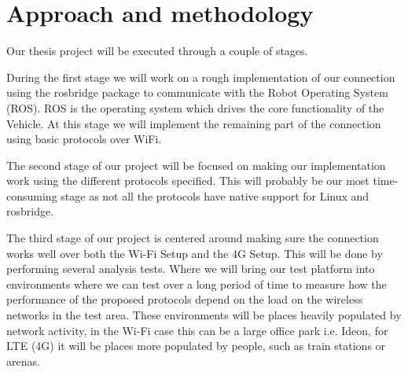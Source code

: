 \documentclass[a4paper]{article}
\begin{document}





\section{Approach and methodology}


Our thesis project will be executed through a couple of stages.

During the first stage we will work on a rough implementation of our connection
using the rosbridge package to communicate with the Robot Operating System
(ROS). ROS is the operating system which drives the core functionality of the 
Vehicle. At this stage we will implement the remaining part of the connection
using basic protocols over WiFi.

The second stage of our project will be focused on making our implementation 
work using the different protocols specified. This will probably be our most 
time-consuming stage as not all the protocols have native support for Linux and
rosbridge.

The third stage of our project is centered around making sure the connection 
works well over both the Wi-Fi Setup and the 4G Setup. This will be done by
performing several analysis tests. Where we will bring our test platform into
environments where we can test over a long period of time to measure 
how the performance of the proposed protocols depend on the load on the wireless
networks in the test area. These environments will be
places heavily populated by network activity, in the Wi-Fi case this can be a
large office park i.e. Ideon, for LTE (4G) it will be places more populated by
people, such as train stations or arenas.
\end{document}
